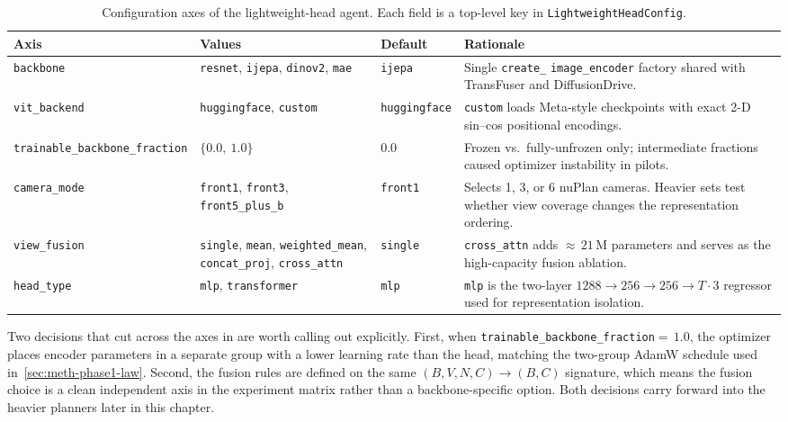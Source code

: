 \begin{table}[ht]
\centering
\caption{Configuration axes of the lightweight-head agent. Each field is a top-level key in \texttt{LightweightHeadConfig}.}
\label{tab:meth-lh-design}
\small
\renewcommand{\arraystretch}{1.2}
\setlength{\tabcolsep}{4pt}
\begin{tabular}{@{}>{\raggedright\arraybackslash}p{3.2cm} >{\raggedright\arraybackslash}p{3.3cm} >{\raggedright\arraybackslash}p{1.7cm} >{\raggedright\arraybackslash}p{4.3cm}@{}}
\toprule
\textbf{Axis} & \textbf{Values} & \textbf{Default} & \textbf{Rationale} \\
\midrule
\texttt{backbone} &
  \texttt{resnet}, \texttt{ijepa}, \texttt{dinov2}, \texttt{mae} &
  \texttt{ijepa} &
  Single \texttt{create\_} \texttt{image\_encoder} factory shared with Trans\-Fuser and Diffusion\-Drive. \\
\texttt{vit\_backend} &
  \texttt{huggingface}, \texttt{custom} &
  \texttt{hugging\-face} &
  \texttt{custom} loads Meta-style checkpoints with exact 2-D sin--cos positional encodings. \\
\texttt{trainable\_}\newline\texttt{backbone\_}\newline\texttt{fraction} &
  $\{0.0,\ 1.0\}$ &
  $0.0$ &
  Frozen vs.\ fully-unfrozen only; intermediate fractions caused optimizer instability in pilots. \\
\texttt{camera\_mode} &
  \texttt{front1}, \texttt{front3}, \texttt{front5\_}\texttt{plus\_b} &
  \texttt{front1} &
  Selects 1, 3, or 6 nuPlan cameras. Heavier sets test whether view coverage changes the representation ordering. \\
\texttt{view\_fusion} &
  \texttt{single}, \texttt{mean}, \texttt{weighted\_}\texttt{mean}, \texttt{concat\_}\texttt{proj}, \texttt{cross\_attn} &
  \texttt{single} &
  \texttt{cross\_attn} adds ${\approx}\,21$\,M parameters and serves as the high-capacity fusion ablation. \\
\texttt{head\_type} &
  \texttt{mlp}, \texttt{transformer} &
  \texttt{mlp} &
  \texttt{mlp} is the two-layer $1288{\to}256{\to}256{\to}T{\cdot}3$ regressor used for representation isolation. \\
\bottomrule
\end{tabular}
\end{table}

Two decisions that cut across the axes in  are worth calling out explicitly. First, when \texttt{trainable\_backbone\_fraction}${=}\,1.0$, the optimizer places encoder parameters in a separate group with a lower learning rate than the head, matching the two-group AdamW schedule used in~\ref{sec:meth-phase1-law}. Second, the fusion rules are defined on the same $(B, V, N, C)\to(B, C)$ signature, which means the fusion choice is a clean independent axis in the experiment matrix rather than a backbone-specific option. Both decisions carry forward into the heavier planners later in this chapter.

